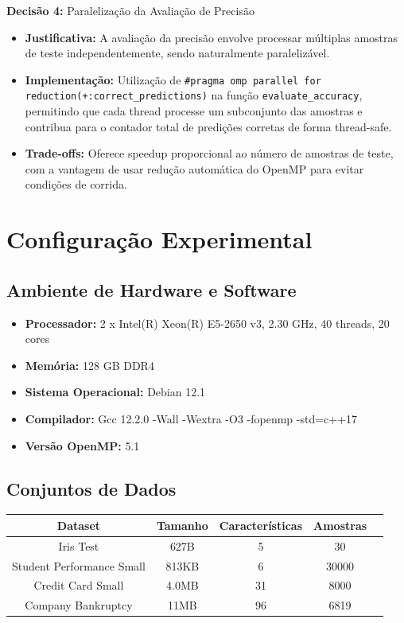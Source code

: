 \documentclass[a4paper,11pt]{article}
\begin{document}
\textbf{Decisão 4:} Paralelização da Avaliação de Precisão
\begin{itemize}
    \item \textbf{Justificativa:} A avaliação da precisão envolve processar múltiplas amostras de teste independentemente, sendo naturalmente paralelizável.
    \item \textbf{Implementação:} Utilização de \texttt{\#pragma omp parallel for reduction(+:correct\_predictions)} na função \texttt{evaluate\_accuracy}, permitindo que cada thread processe um subconjunto das amostras e contribua para o contador total de predições corretas de forma thread-safe.
    \item \textbf{Trade-offs:} Oferece speedup proporcional ao número de amostras de teste, com a vantagem de usar redução automática do OpenMP para evitar condições de corrida.
\end{itemize}

\section{Configuração Experimental}

\subsection{Ambiente de Hardware e Software}
\begin{itemize}
    \item \textbf{Processador:} 2 x Intel(R) Xeon(R) E5-2650 v3, 2.30 GHz, 40 threads, 20 cores
    \item \textbf{Memória:} 128 GB DDR4
    \item \textbf{Sistema Operacional:} Debian 12.1
    \item \textbf{Compilador:} Gcc 12.2.0 -Wall -Wextra -O3 -fopenmp -std=c++17
    \item \textbf{Versão OpenMP:} 5.1
\end{itemize}

\subsection{Conjuntos de Dados}

\begin{table}[H]
\centering
\begin{tabular}{|c|c|c|c|c|}
\hline
\textbf{Dataset} & \textbf{Tamanho} & \textbf{Características} & \textbf{Amostras} \\
\hline
Iris Test & 627B & 5 & 30 \\
\hline
Student Performance Small & 813KB & 6 & 30000 \\
\hline
Credit Card Small & 4.0MB & 31 & 8000\\
\hline
Company Bankruptcy & 11MB & 96 & 6819 \\
\hline
\end{tabular}
\end{table}
\end{document}
